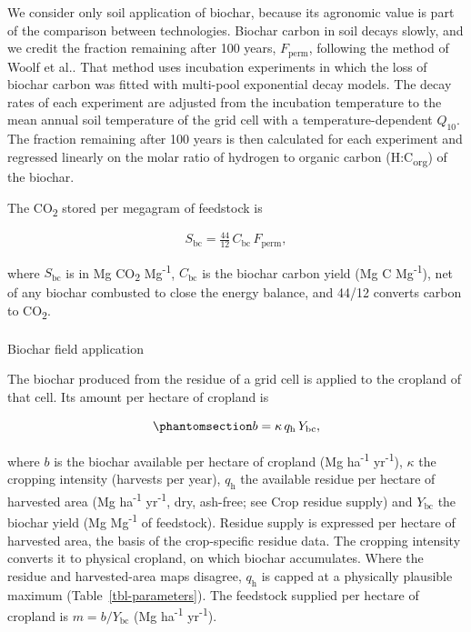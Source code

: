 \documentclass[
  letterpaper,
  twoside,
  twocolumn,
  9pt]{article}
\makeatletter
\let\oldparagraph\paragraph
\renewcommand{\paragraph}{
    \@ifstar
      \xxxParagraphStar
      \xxxParagraphNoStar
  }
\newcommand{\xxxParagraphStar}[1]{\oldparagraph*{#1}\mbox{}}
\newcommand{\xxxParagraphNoStar}[1]{\oldparagraph{#1}\mbox{}}
\makeatother
\begin{document}
We consider only soil application of biochar, because its agronomic
value is part of the comparison between technologies. Biochar carbon in
soil decays slowly, and we credit the fraction remaining after 100
years, \(F_{\mathrm{perm}}\), following the method of Woolf et
al.\citep{woolf2021greenhouse}. That method uses incubation experiments
in which the loss of biochar carbon was fitted with multi-pool
exponential decay models. The decay rates of each experiment are
adjusted from the incubation temperature to the mean annual soil
temperature of the grid cell with a temperature-dependent \(Q_{10}\).
The fraction remaining after 100 years is then calculated for each
experiment and regressed linearly on the molar ratio of hydrogen to
organic carbon (H:C\textsubscript{org}) of the biochar.

The CO\textsubscript{2} stored per megagram of feedstock is

\[S_{\mathrm{bc}} = \tfrac{44}{12}\, C_{\mathrm{bc}}\, F_{\mathrm{perm}},\]

where \(S_{\mathrm{bc}}\) is in Mg CO\textsubscript{2}
Mg\textsuperscript{-1}, \(C_{\mathrm{bc}}\) is the biochar carbon yield
(Mg C Mg\textsuperscript{-1}), net of any biochar combusted to close the
energy balance, and 44/12 converts carbon to CO\textsubscript{2}.

\paragraph{Biochar field application}\label{biochar-field-application}

The biochar produced from the residue of a grid cell is applied to the
cropland of that cell. Its amount per hectare of cropland is

\begin{equation}\phantomsection\label{eq-bc-supply}{b = \kappa\, q_{\mathrm{h}}\, Y_{\mathrm{bc}},}\end{equation}

where \(b\) is the biochar available per hectare of cropland (Mg
ha\textsuperscript{-1} yr\textsuperscript{-1}), \(\kappa\) the cropping
intensity (harvests per year), \(q_{\mathrm{h}}\) the available residue
per hectare of harvested area (Mg ha\textsuperscript{-1}
yr\textsuperscript{-1}, dry, ash-free; see Crop residue supply) and
\(Y_{\mathrm{bc}}\) the biochar yield (Mg Mg\textsuperscript{-1} of
feedstock). Residue supply is expressed per hectare of harvested area,
the basis of the crop-specific residue data.\citep{karan2023} The
cropping intensity converts it to physical cropland, on which biochar
accumulates. Where the residue and harvested-area maps disagree,
\(q_{\mathrm{h}}\) is capped at a physically plausible maximum
(Table~\ref{tbl-parameters}). The feedstock supplied per hectare of
cropland is \(m = b / Y_{\mathrm{bc}}\) (Mg ha\textsuperscript{-1}
yr\textsuperscript{-1}).
\end{document}
